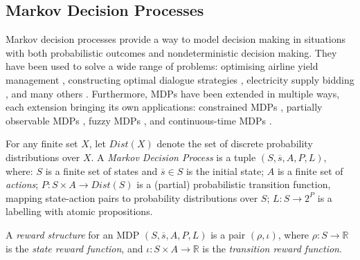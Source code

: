 \documentclass[runningheads]{llncs}
\newcommand\Dist{\mathit{Dist}}
\begin{document}
\subsection{Markov Decision Processes}

Markov decision processes \cite{bellman1957markovian,howard1960dynamic} provide
a way to model decision making in situations with both probabilistic outcomes
and nondeterministic decision making. They have been used to solve a wide range
of problems: optimising airline yield management
\cite{DBLP:journals/transci/LautenbacherS99}, constructing optimal dialogue
strategies \cite{658989,DBLP:conf/icassp/LevinPE98}, electricity supply bidding
\cite{867150}, and many others
\cite{DBLP:journals/questa/StidhamW93,white1985real,white1988further,white1993survey}.
Furthermore, MDPs have been extended in multiple ways, each extension bringing
its own applications: constrained MDPs \cite{altman1999constrained}, partially
observable MDPs \cite{astrom1965optimal}, fuzzy MDPs \cite{fakoor2016humanoid},
and continuous-time MDPs \cite{guo2009continuous}.

\begin{definition} \label{mdp}
  For any finite set $X$, let $\Dist(X)$ denote the set of discrete probability
  distributions over $X$. A \emph{Markov Decision Process} is a tuple $(S,
  \overline{s}, A, P, L)$, where: $S$ is a finite set of states and
  $\overline{s} \in S$ is the initial state; $A$ is a finite set of
  \emph{actions}; $P : S \times A \to \Dist(S)$ is a (partial) probabilistic
  transition function, mapping state-action pairs to probability distributions
  over $S$; $L : S \to 2^P$ is a labelling with atomic propositions.
\end{definition}

\begin{definition}
  A \emph{reward structure} for an MDP $(S, \overline{s}, A, P, L)$ is a pair
  $(\rho, \iota)$, where $\rho : S \to \mathbb{R}$ is the \emph{state reward
    function}, and $\iota : S \times A \to \mathbb{R}$ is the \emph{transition
    reward function}.
\end{definition}
\end{document}
